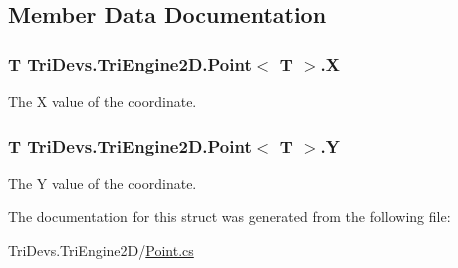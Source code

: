 \subsection{Member Data Documentation}
\hypertarget{struct_tri_devs_1_1_tri_engine2_d_1_1_point_3_01_t_01_4_a2738701b3c9f15a960ea2348a8c8d07a}{
\subsubsection[{X}]{\setlength{\rightskip}{0pt plus 5cm}T Tri\-Devs.\-Tri\-Engine2\-D.\-Point$<$ T $>$.X}}\label{struct_tri_devs_1_1_tri_engine2_d_1_1_point_3_01_t_01_4_a2738701b3c9f15a960ea2348a8c8d07a}


The X value of the coordinate. 

\hypertarget{struct_tri_devs_1_1_tri_engine2_d_1_1_point_3_01_t_01_4_a46cca63b4166f1794cd812fe085d237d}{
\subsubsection[{Y}]{\setlength{\rightskip}{0pt plus 5cm}T Tri\-Devs.\-Tri\-Engine2\-D.\-Point$<$ T $>$.Y}}\label{struct_tri_devs_1_1_tri_engine2_d_1_1_point_3_01_t_01_4_a46cca63b4166f1794cd812fe085d237d}


The Y value of the coordinate. 



The documentation for this struct was generated from the following file\-:\begin{DoxyCompactItemize}
\item 
Tri\-Devs.\-Tri\-Engine2\-D/\hyperlink{_point_8cs}{Point.\-cs}\end{DoxyCompactItemize}
